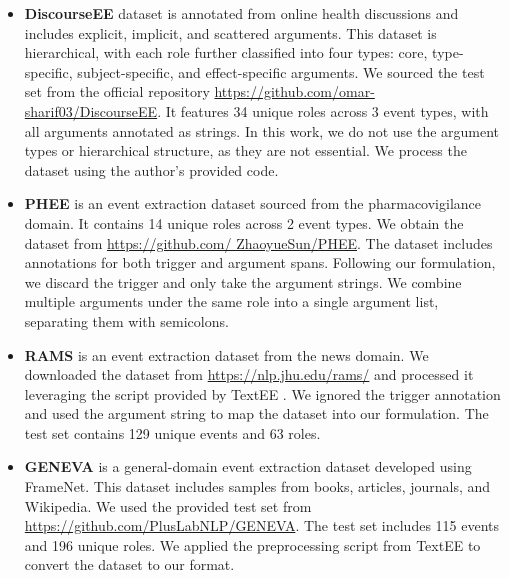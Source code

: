 \begin{itemize}
    \item  \textbf{DiscourseEE} \cite{sharif-etal-2024-explicit} dataset is annotated from online health discussions and includes explicit, implicit, and scattered arguments. This dataset is hierarchical, with each role further classified into four types: core, type-specific, subject-specific, and effect-specific arguments. We sourced the test set from the official repository 
\href{https://github.com/omar-sharif03/DiscourseEE/tree/main/Data}{https://github.com/omar-sharif03/DiscourseEE}. It features 34 unique roles across 3 event types, with all arguments annotated as strings. In this work, we do not use the argument types or hierarchical structure, as they are not essential. We process the dataset using the author's provided code.

\item  \textbf{PHEE} \cite{sun-etal-2022-phee} is an event extraction dataset sourced from the pharmacovigilance domain. It contains 14 unique roles across 2 event types. We obtain the dataset from \href{https://github.com/ZhaoyueSun/PHEE}{https://github.com/ ZhaoyueSun/PHEE}. The dataset includes annotations for both trigger and argument spans. Following our formulation, we discard the trigger and only take the argument strings. We combine multiple arguments under the same role into a single argument list, separating them with semicolons.

\item \textbf{RAMS} \cite{ebner-etal-2020-multi} is an event extraction dataset from the news domain. We downloaded the dataset from \href{https://nlp.jhu.edu/rams/}{https://nlp.jhu.edu/rams/} and processed it leveraging the script provided by TextEE \cite{huang-etal-2024-textee}. We ignored the trigger annotation and used the argument string to map the dataset into our formulation. The test set contains 129 unique events and 63 roles.

\item \textbf{GENEVA} \cite{parekh-etal-2023-geneva} is a general-domain event extraction dataset developed using FrameNet. This dataset includes samples from books, articles, journals, and Wikipedia. We used the provided test set from \href{https://github.com/PlusLabNLP/GENEVA/tree/main/data}{https://github.com/PlusLabNLP/GENEVA}. The test set includes 115 events and 196 unique roles. We applied the preprocessing script from TextEE \cite{huang-etal-2024-textee} to convert the dataset to our format.


\end{itemize}

